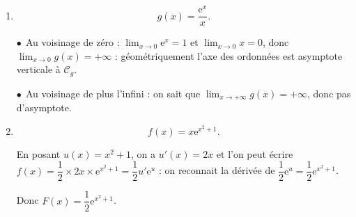 \documentclass[10pt]{article}
\providecommand{\e}{{\mathrm{e}}}
\begin{document}
\begin{enumerate}[resume]
On a quel que soit le naturel $n$, \: $b_{n+1} - b_n = \ln \left(\dfrac{2}{\left(b_n \right)^2 + 3}\right)$.

Or quel que soit le réel $b_n$, \: $b_n^2 \geqslant 0$, donc $\left(b_n\right)^2 + 3 \geqslant 3 > 2$, donc $\dfrac{2}{\left(b_n \right)^2 + 3} < 1$ et enfin $\ln \left(\dfrac{2}{\left(b_n \right)^2 + 3}\right) < 0$.

Conclusion : $b_{n+1} - b_n < 0$ montre que la suite $\left(b_n\right)$ est décroissante.

\item 

\[g(x) = \dfrac{\e^x}{x}.\]













$\bullet~~$Au voisinage de zéro : $\displaystyle\lim_{x \to 0} \e^x = 1$ et $\displaystyle\lim_{x \to 0}x  = 0$, donc $\displaystyle\lim_{x \to 0} g(x) = +\infty$ : géométriquement l'axe des ordonnées est asymptote verticale à $\mathcal{C}_g$.

$\bullet~~$Au voisinage de plus l'infini : on sait que $\displaystyle\lim_{x \to + \infty} g(x) = + \infty$, donc pas d'asymptote.

\item 

\[f(x) = x\e^{x^2+1}.\]









En posant $u(x) = x^2 + 1$, on a $u'(x) = 2x$ et l'on peut écrire $f(x) = \dfrac12 \times 2x \times \e^{x^2+1} = \dfrac12 u'\e^u$ : on reconnait la dérivée de $\dfrac12\e^u = \dfrac12\e^{x^2 + 1}$.

Donc $F(x) = \dfrac12\e^{x^2+1}$.
\end{enumerate}
\end{document}
